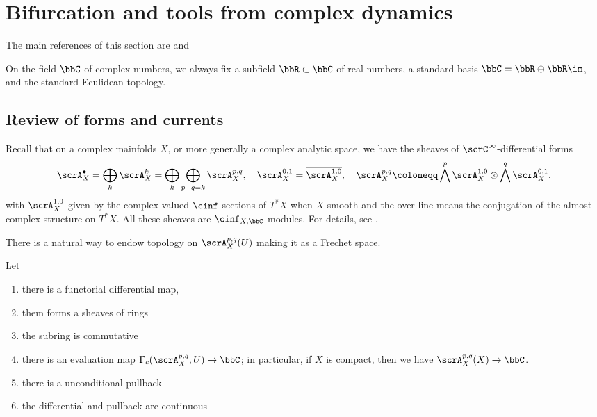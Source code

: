 \section{Bifurcation and tools from complex dynamics}

The main references of this section are \cite{DeMarco-2003-DynamicsRationalMaps,DeMarco-2018-DynamicalModuliSpaces} and \Yang{}

On the field $\bbC$ of complex numbers, we always fix a subfield $\bbR\subset \bbC$ of real numbers, a standard basis $\bbC = \bbR \oplus \bbR \im$, and the standard Eculidean topology.
\Yang{}



\subsection[status=draft,tag=0000000,label=\labelNFM{subsec:forms-and-currents}]{Review of forms and currents}

Recall that on a complex mainfolds $X$, or more generally a complex analytic space, we have the sheaves of $\scrC^\infty$-differential forms
\[ \scrA_X^\bullet = \bigoplus_{k} \scrA_X^k = \bigoplus_{k} \bigoplus_{p+q = k} \scrA_X^{p,q}, \quad \scrA_X^{0,1} = \overline{\scrA_{X}^{1,0}}, \quad \scrA_X^{p,q} \coloneqq \bigwedge^p \scrA_X^{1,0} \otimes \bigwedge^q \scrA_X^{0,1}. \]
with $\scrA_X^{1,0}$ given by the complex-valued $\cinf$-sections of $T^*X$ when $X$ smooth and the over line means the conjugation of the almost complex structure on $T^*X$.
All these sheaves are $\cinf_{X,\bbC}$-modules.
For details, see \cite{Demailly-2012-ComplexAnalyticDifferential,Barlet-Magnusson-2019-ComplexAnalyticCycles}.

There is a natural way to endow topology on $\scrA_X^{p,q}(U)$ making it as a Frechet space.
\Yang{}

\begin{proposition}[label=\labelNFM{prop:basic-properties-of-forms-with-topology}, status=draft, tag=0000000]
	Let \Yang{}
	\begin{enumerate}
		\item there is a functorial differential map,
		\item them forms a sheaves of rings
		\item the subring is commutative
		\item there is an evaluation map $\Gamma_c(\scrA_X^{p,q},U) \to \bbC$; in particular, if $X$ is compact, then we have $\scrA_X^{p,q}(X) \to \bbC$.
		\item there is a unconditional pullback
		\item the differential and pullback are continuous
	\end{enumerate}
	\Yang{}
\end{proposition}

